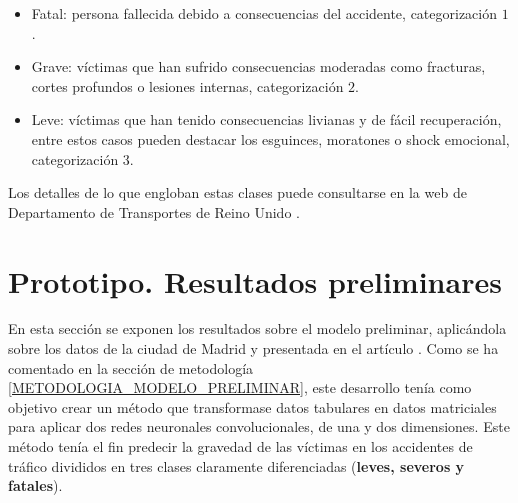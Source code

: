 \documentclass{uathesis-es}
\begin{document}
{\begin{itemize}
    \item Fatal: persona fallecida debido a consecuencias del accidente, categorización $1$.
    \item Grave: víctimas que han sufrido consecuencias moderadas como fracturas, cortes profundos o lesiones internas, categorización $2$.
    \item Leve: víctimas que han tenido consecuencias livianas y de fácil recuperación, entre estos casos pueden destacar los esguinces, moratones o shock emocional, categorización $3$.
\end{itemize}

Los detalles de lo que engloban estas clases puede consultarse en la web de Departamento de Transportes de Reino Unido \cite{UKDepartmentSeverityDefinition}.



\section{Prototipo. Resultados preliminares}






En esta sección se exponen los resultados sobre el modelo preliminar, aplicándola sobre los datos de la ciudad de Madrid y presentada en el artículo \cite{PEREZSALA2023113245}. Como se ha comentado en la sección de metodología \ref{METODOLOGIA_MODELO_PRELIMINAR}, este desarrollo tenía como objetivo crear un método que transformase datos tabulares en datos matriciales para aplicar dos redes neuronales convolucionales, de una y dos dimensiones. Este método tenía el fin predecir la gravedad de las víctimas en los accidentes de tráfico divididos en tres clases claramente diferenciadas (\textbf{leves, severos y fatales}). 

}
\end{document}
